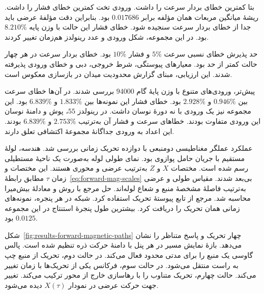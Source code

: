 بتا کمترین خطای بردار سرعت را داشت.
ورودی تخت کمترین خطای فشار را داشت.
ریشهٔ میانگین مربعات همان مؤلفه برابر $0.017686$ بود.
بنابراین دقت مؤلفهٔ عرضی باید جدا از خطای بردار سرعت سنجیده شود.
خطای فشار این حالت با وزن پایه $8.210\%$ بود.
در این مجموعه، شکل ورودی و عدد رینولدز هم‌زمان تغییر کردند.

حد پذیرش خطای نسبی سرعت $5\%$ و فشار $10\%$ بود.
خطای بردار سرعت در هر چهار حالت کمتر از حد بود.
معیارهای پیوستگی، شرط خروجی، دبی و خطای ورودی پذیرفته شدند.
این ارزیابی، مبنای گزارش محدودیت میدان در بازسازی معکوس است.

پیش‌تر، ورودی‌های متنوع با وزن پایهٔ گام $94000$ بررسی شدند.
در آن‌ها خطای سرعت بین $0.946\%$ و $2.928\%$ بود.
خطای فشار این نمونه‌ها بین $1.833\%$ و $6.839\%$ بود.
این مجموعه نیز یک ورودی با نه دورهٔ نوسان داشت.
در رینولدز $55$، پوش و دامنهٔ نوسان این ورودی متفاوت بودند.
خطاهای سرعت و فشار آن به‌ترتیب $2.753\%$ و $6.839\%$ بودند.
این اعداد به ورودی جداگانهٔ مجموعهٔ اکتشافی تعلق دارند.

\label{sec:results-forward-magnetic}

عملکرد عملگر مغناطیسی دومنبعی با دوازده تحریک زمانی بررسی شد.
هندسه، لولهٔ مستقیم با جریان حامل پوازوی بود.
نمای طولی لوله به‌صورت یک ناحیهٔ مستطیلی رسم شده است.
مختصات $X$ و $Z$ به‌ترتیب عرضی و محوری هستند.
این مختصات و زمان $\tau$ مطابق رابطهٔ~\eqref{eq:forward-mag-scales} بی‌بعد شدند.
مقیاس طولی و عرضی به‌ترتیب فاصلهٔ مشخصهٔ منبع و شعاع لوله‌اند.
حل مرجع با روش  و معادلهٔ بیش‌میرا محاسبه شد.
مرجع از تابع پیوستهٔ تحریک استفاده کرد.
شبکه در هر پنجره، نمونه‌های زمانی همان تحریک را دریافت کرد.
بیشترین طول پنجرهٔ استنتاج در این مجموعه $0.0125$ بود.

شکل~\ref{fig:results-forward-magnetic-paths} چهار تحریک و پاسخ متناظر را نشان می‌دهد.
بازهٔ نمایش مسیر در هر پنل با دامنهٔ حرکت ذره تنظیم شده است.
پالس گاوسی یک منبع را برای مدتی محدود فعال می‌کند.
در حالت دوم، تحریک از منبع چپ به راست منتقل می‌شود.
در حالت سوم، فرکانس یکی از تحریک‌ها با زمان تغییر می‌کند.
حالت چهارم، تحریک متناوب را با رهاسازی خارج از محور ترکیب می‌کند.
تغییر جهت حرکت عرضی در نمودار $X(\tau)$ دیده می‌شود.

